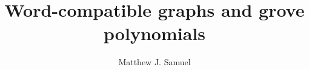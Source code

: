 \documentclass{amsart}
\title{Word-compatible graphs and grove polynomials}
\author{Matthew J. Samuel}
\newtheorem{theorem}[lemma]{Theorem}
\theoremstyle{definition}
\newtheorem{definition}[lemma]{Definition}
\theoremstyle{remark}
\numberwithin{equation}{subsection}
\newcommand{\maxd}{\mathfrak{m}}
\begin{document}
\begin{abstract}
\end{abstract}

	\maketitle






\end{document}
